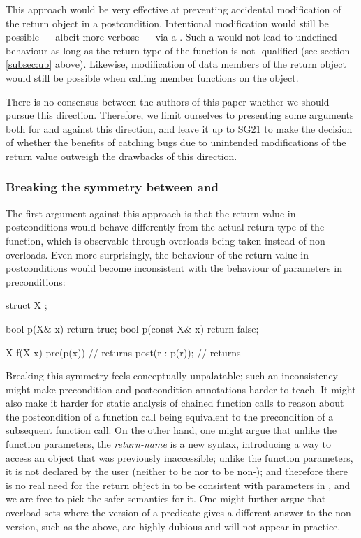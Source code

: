 This approach would be very effective at preventing accidental modification of the return object in a postcondition. Intentional modification would still be possible --- albeit more verbose --- via a . Such a  would not lead to undefined behaviour as long as the return type of the function is not -qualified (see section \ref{subsec:ub} above). Likewise, modification of  data members of the return object would still be possible when calling  member functions on the object.

There is no consensus between the authors of this paper whether we should pursue this direction. Therefore, we limit ourselves to presenting some arguments both for and against this direction, and leave it up to SG21 to make the decision of whether the benefits of catching bugs due to unintended modifications of the return value outweigh the drawbacks of this direction.

\subsubsection{Breaking the symmetry between  and }

The first argument against this approach is that the return value in postconditions would behave differently from the actual return type of the function, which is observable through  overloads being taken instead of non- overloads. Even more surprisingly, the behaviour of the return value in postconditions would become inconsistent with the behaviour of parameters in preconditions:

\begin{codeblock}
struct X {};

bool p(X& x)       { return true; }
bool p(const X& x) { return false; } 

X f(X x)
  pre(p(x))        // returns 
  post(r : p(r));  // returns 
\end{codeblock}

Breaking this symmetry feels conceptually unpalatable; such an inconsistency might make precondition and postcondition annotations harder to teach. It might also make it harder for static analysis of chained function calls to reason about the postcondition of a function call being equivalent to the precondition of a subsequent function call. On the other hand, one might argue that unlike the function parameters, the \emph{return-name} is a new syntax, introducing a way to access an object that was previously inaccessible; unlike the function parameters, it is not declared by the user (neither to be  nor to be non-); and therefore there is no real need for the return object in  to be consistent with parameters in , and we are free to pick the safer semantics for it. One might further argue that overload sets where the  version of a predicate gives a different answer to the non- version, such as the above, are highly dubious and will not appear in practice.

